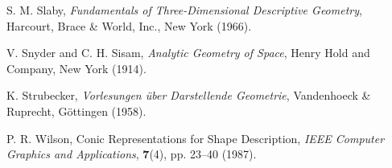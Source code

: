 \begin{thebibliography}{99}
     S. M. Slaby,
     {\em Fundamentals of Three-Dimensional Descriptive Geometry},
     Harcourt, Brace \& World, Inc., New York (1966).

     V. Snyder and C. H. Sisam,
     {\em Analytic Geometry of Space},
     Henry Hold and Company, New York (1914).

     K. Strubecker,
     {\em Vorlesungen \"{u}ber Darstellende Geometrie},
     Vandenhoeck \& Ruprecht, G\"{o}ttingen (1958).

     P. R. Wilson,
     Conic Representations for Shape Description,
     {\em IEEE Computer Graphics and Applications},
     {\bf 7}(4), pp. 23--40 (1987).

\end{thebibliography}




